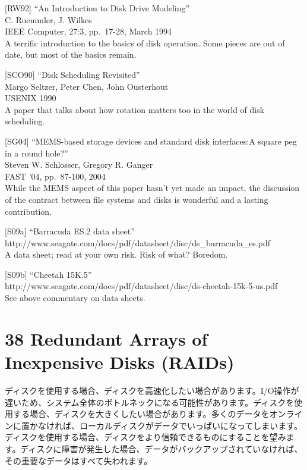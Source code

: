 {[}RW92{]} ``An Introduction to Disk Drive Modeling''\\
C. Ruemmler, J. Wilkes\\
IEEE Computer, 27:3, pp.~17-28, March 1994\\
A terrific introduction to the basics of disk operation. Some pieces are
out of date, but most of the basics remain.

{[}SCO90{]} ``Disk Scheduling Revisited''\\
Margo Seltzer, Peter Chen, John Ousterhout\\
USENIX 1990\\
A paper that talks about how rotation matters too in the world of disk
scheduling.

{[}SG04{]} ``MEMS-based storage devices and standard disk interfaces:A
square peg in a round hole?''\\
Steven W. Schlosser, Gregory R. Ganger\\
FAST '04, pp.~87-100, 2004\\
While the MEMS aspect of this paper hasn't yet made an impact, the
discussion of the contract between file systems and disks is wonderful
and a lasting contribution.

{[}S09a{]} ``Barracuda ES.2 data sheet''\\
http://www.seagate.com/docs/pdf/datasheet/disc/ds\_barracuda\_es.pdf\\
A data sheet; read at your own risk. Risk of what? Boredom.

{[}S09b{]} ``Cheetah 15K.5''\\
http://www.seagate.com/docs/pdf/datasheet/disc/ds-cheetah-15k-5-us.pdf\\
See above commentary on data sheets.

\hypertarget{redundant-arrays-of-inexpensive-disks-raids}{%
\section*{38 Redundant Arrays of Inexpensive Disks
(RAIDs)}\label{redundant-arrays-of-inexpensive-disks-raids}}

ディスクを使用する場合、ディスクを高速化したい場合があります。I/O操作が遅いため、システム全体のボトルネックになる可能性があります。ディスクを使用する場合、ディスクを大きくしたい場合があります。多くのデータをオンラインに置かなければ、ローカルディスクがデータでいっぱいになってしまいます。ディスクを使用する場合、ディスクをより信頼できるものにすることを望みます。ディスクに障害が発生した場合、データがバックアップされていなければ、その重要なデータはすべて失われます。

